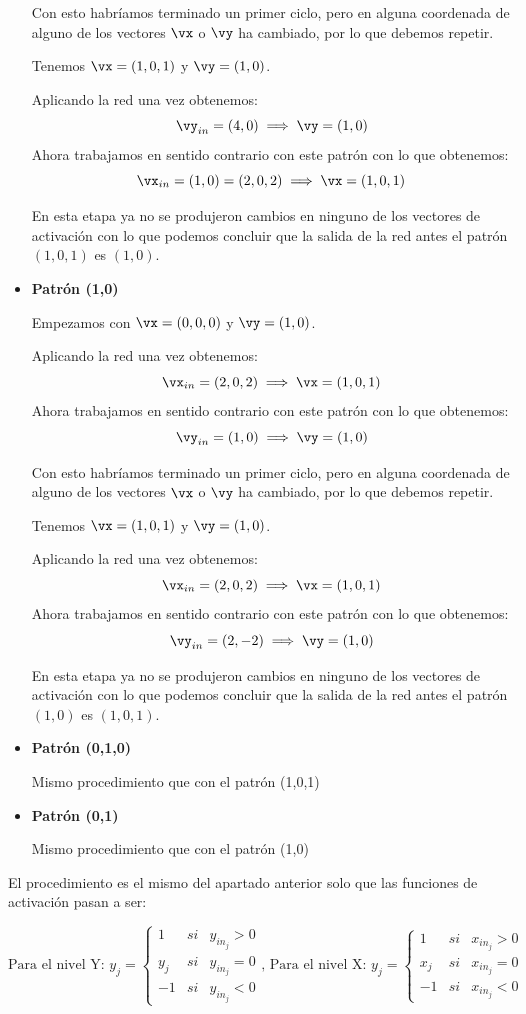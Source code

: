 \begin{problem}[10]
\begin{itemize}
Con esto habríamos terminado un primer ciclo, pero en alguna coordenada de alguno de los vectores $\vx$ o $\vy$ ha cambiado, por lo que debemos repetir.

Tenemos $\vx=(1,0,1)$ y $\vy = (1,0)$.

Aplicando la red una vez obtenemos:
\[\vy_{in} = (4,0) \implies \vy = (1,0)\]
Ahora trabajamos en sentido contrario con este patrón con lo que obtenemos:
\[\vx_{in} = (1,0) = (2,0,2) \implies \vx = (1,0,1)\]

En esta etapa ya no se produjeron cambios en ninguno de los vectores de activación con lo que podemos concluir que la salida de la red antes el patrón $(1,0,1)$ es $(1,0)$.

\item \textbf{Patrón (1,0)}

Empezamos con $\vx=(0,0,0)$ y $\vy = (1,0)$.

Aplicando la red una vez obtenemos:
\[\vx_{in} = (2,0,2) \implies \vx = (1,0,1)\]
Ahora trabajamos en sentido contrario con este patrón con lo que obtenemos:
\[\vy_{in} = (1,0)  \implies \vy = (1,0)\]

Con esto habríamos terminado un primer ciclo, pero en alguna coordenada de alguno de los vectores $\vx$ o $\vy$ ha cambiado, por lo que debemos repetir.

Tenemos $\vx=(1,0,1)$ y $\vy = (1,0)$.

Aplicando la red una vez obtenemos:
\[\vx_{in} = (2,0,2) \implies \vx = (1,0,1)\]
Ahora trabajamos en sentido contrario con este patrón con lo que obtenemos:
\[\vy_{in} = (2,-2) \implies \vy = (1,0)\]


En esta etapa ya no se produjeron cambios en ninguno de los vectores de activación con lo que podemos concluir que la salida de la red antes el patrón $(1,0)$ es $(1,0,1)$.

\item \textbf{Patrón (0,1,0)}

Mismo procedimiento que con el patrón (1,0,1)

\item \textbf{Patrón (0,1)}

Mismo procedimiento que con el patrón (1,0)
\end{itemize}

\spart

El procedimiento es el mismo del apartado anterior solo que las funciones de activación pasan a ser:

\[\text{Para el nivel Y: } y_j = \left\{ \begin{array}{lll}
1   & si & y_{in_j} > 0 \\
y_j & si & y_{in_j} = 0 \\
-1   & si & y_{in_j} < 0
\end{array}\right. \text{,   Para el nivel X: } y_j = \left\{ \begin{array}{lll}
1   & si & x_{in_j} > 0 \\
x_j & si & x_{in_j} = 0 \\
-1   & si & x_{in_j} < 0
\end{array}\right.\]


\end{problem}
